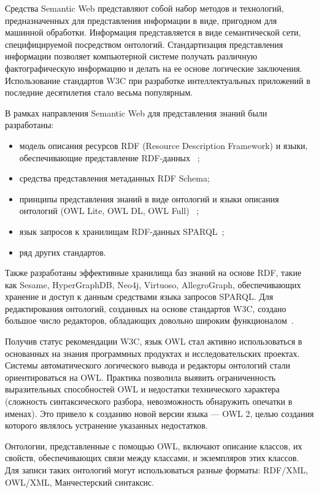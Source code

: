 Средства Semantic Web представляют собой набор методов и технологий, предназначенных для представления информации в виде, пригодном для машинной обработки. Информация представляется в виде семантической сети, специфицируемой посредством онтологий. Стандартизация представления информации позволяет компьютерной системе получать различную фактографическую информацию и делать на ее основе логические заключения. Использование стандартов W3C при разработке интеллектуальных приложений в последние десятилетия стало весьма популярным.

В рамках направления Semantic Web для представления знаний были разработаны:
\begin{itemize}
  \item модель описания ресурсов RDF  (Resource Description Framework) и языки, обеспечивающие представление RDF-данных ~\cite{RDF}; 
  \item средства представления метаданных RDF Schema;
  \item принципы представления знаний в виде онтологий и языки описания онтологий (OWL Lite, OWL DL, OWL Full) ~\cite{OWL2012};
  \item язык запросов к хранилищам RDF-данных SPARQL~\cite{SPARQL2013}; 
  \item ряд других стандартов.
\end{itemize}

Также разработаны эффективные хранилища баз знаний на основе RDF, такие как Sesame, HyperGraphDB, Neo4j, Virtuoso, AllegroGraph, обеспечивающих хранение и доступ к данным средствами языка запросов SPARQL. Для редактирования онтологий, созданных на основе стандартов W3C, создано большое число редакторов, обладающих довольно широким функционалом~\cite{OntologyTools2016, OWL2016}.

Получив статус рекомендации W3C, язык OWL стал активно использоваться в основанных на знания программных продуктах и исследовательских проектах. Системы автоматического логического вывода и редакторы онтологий стали ориентироваться на OWL. Практика позволила выявить ограниченность выразительных способностей OWL и недостатки технического характера (сложность синтаксического разбора, невозможность обнаружить опечатки в именах). Это привело к созданию новой версии языка — OWL 2, целью создания которого являлось устранение указанных недостатков.

Онтологии, представленные с помощью OWL, включают описание классов, их свойств, обеспечивающих связи между классами, и экземпляров этих классов. Для записи таких онтологий могут использоваться разные форматы: RDF/XML, OWL/XML, Манчестерский синтаксис.

